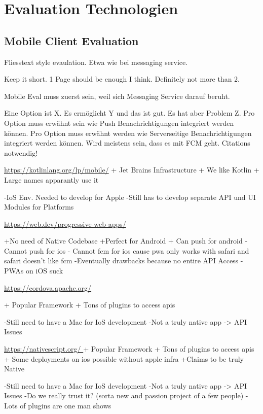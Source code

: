 \section{Evaluation Technologien}\label{sec:evaluation-technologien}

\subsection{Mobile Client Evaluation}\label{subsec:mobile-client-eval}


Fliesstext style evaulation. Etwa wie bei messaging service.

Keep it short.
1 Page should be enough I think.
Definitely not more than 2.

Mobile Eval muss zuerst sein, weil sich Messaging Service darauf beruht.

Eine Option ist X. Es ermöglicht Y und das ist gut. Es hat aber Problem Z.
Pro Option muss erwähnt sein wie Push Benachrichtigungen integriert werden können.
Pro Option muss erwähnt werden wie Serverseitige Benachrichtigungen integriert werden können.
Wird meistens sein, dass es mit FCM geht.
Citations notwendig!

\url{https://kotlinlang.org/lp/mobile/}
    + Jet Brains Infrastructure
    + We like Kotlin
    + Large names apparantly use it

    -IoS Env. Needed to develop for Apple 
    -Still has to develop separate API und UI Modules for Platforms 

\url{https://web.dev/progressive-web-apps/ }
	
    +No need of Native Codebase
    +Perfect for Android
    + Can push for android
    - Cannot push for ios
    - Cannot fcm for ios cause pwa only works with safari and safari doesn't like fcm
    -Eventually drawbacks because no entire API Access 
    -PWAs on iOS suck

\url{https://cordova.apache.org/} 

    + Popular Framework
    + Tons of plugins to access apis

    -Still need to have a Mac for IoS development  
    -Not a truly native app -> API Issues
 

\url{https://nativescript.org/ }
    + Popular Framework
    + Tons of plugins to access apis
    + Some deployments on ios possible without apple infra
    +Claims to be truly Native

    -Still need to have a Mac for IoS development
    -Not a truly native app -> API Issues
    -Do we really trust it? (sorta new and passion project of a few people)
    - Lots of plugins are one man shows

